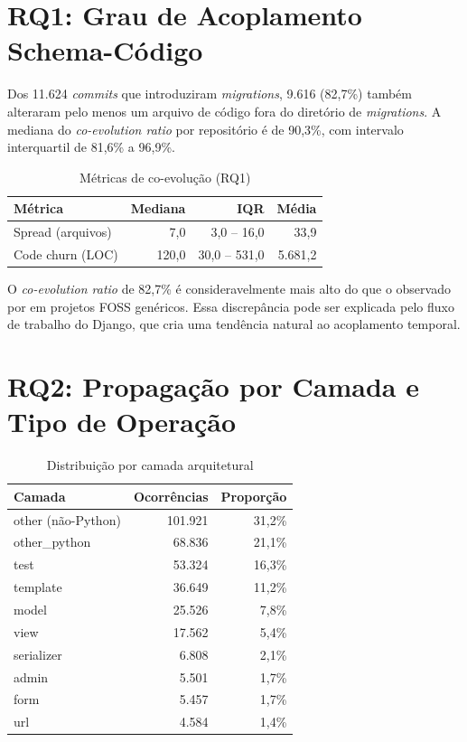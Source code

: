 \documentclass[
  12pt,
  openright,
  oneside,
  a4paper,
  brazil
]{abntex2}
\begin{document}
\section{RQ1: Grau de Acoplamento Schema-Código}

Dos 11.624 \textit{commits} que introduziram \textit{migrations}, 9.616 (82,7\%) também alteraram pelo menos um arquivo de código fora do diretório de \textit{migrations}. A mediana do \textit{co-evolution ratio} por repositório é de 90,3\%, com intervalo interquartil de 81,6\% a 96,9\%.

\begin{table}[htb]
\centering
\caption{Métricas de co-evolução (RQ1)}
\label{tab:rq1}
\begin{tabular}{lrrr}
\toprule
\textbf{Métrica} & \textbf{Mediana} & \textbf{IQR} & \textbf{Média} \\
\midrule
Spread (arquivos) & 7,0 & 3,0 -- 16,0 & 33,9 \\
Code churn (LOC) & 120,0 & 30,0 -- 531,0 & 5.681,2 \\
\bottomrule
\end{tabular}
\end{table}

O \textit{co-evolution ratio} de 82,7\% é consideravelmente mais alto do que o observado por  em projetos FOSS genéricos. Essa discrepância pode ser explicada pelo fluxo de trabalho do Django, que cria uma tendência natural ao acoplamento temporal.

\section{RQ2: Propagação por Camada e Tipo de Operação}

\begin{table}[htb]
\centering
\caption{Distribuição por camada arquitetural}
\label{tab:camadas}
\begin{tabular}{lrr}
\toprule
\textbf{Camada} & \textbf{Ocorrências} & \textbf{Proporção} \\
\midrule
other (não-Python) & 101.921 & 31,2\% \\
other\_python & 68.836 & 21,1\% \\
test & 53.324 & 16,3\% \\
template & 36.649 & 11,2\% \\
model & 25.526 & 7,8\% \\
view & 17.562 & 5,4\% \\
serializer & 6.808 & 2,1\% \\
admin & 5.501 & 1,7\% \\
form & 5.457 & 1,7\% \\
url & 4.584 & 1,4\% \\
\bottomrule
\end{tabular}
\end{table}
\end{document}
